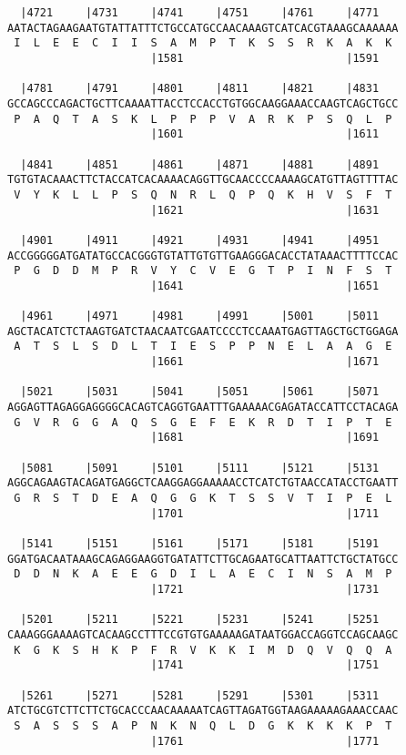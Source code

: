 \documentclass{article}
\begin{document}
\begin{Verbatim}
  |4721     |4731     |4741     |4751     |4761     |4771   
AATACTAGAAGAATGTATTATTTCTGCCATGCCAACAAAGTCATCACGTAAAGCAAAAAA
 I  L  E  E  C  I  I  S  A  M  P  T  K  S  S  R  K  A  K  K 
                      |1581                         |1591   
  
  |4781     |4791     |4801     |4811     |4821     |4831   
GCCAGCCCAGACTGCTTCAAAATTACCTCCACCTGTGGCAAGGAAACCAAGTCAGCTGCC
 P  A  Q  T  A  S  K  L  P  P  P  V  A  R  K  P  S  Q  L  P 
                      |1601                         |1611   
  
  |4841     |4851     |4861     |4871     |4881     |4891   
TGTGTACAAACTTCTACCATCACAAAACAGGTTGCAACCCCAAAAGCATGTTAGTTTTAC
 V  Y  K  L  L  P  S  Q  N  R  L  Q  P  Q  K  H  V  S  F  T 
                      |1621                         |1631   
  
  |4901     |4911     |4921     |4931     |4941     |4951   
ACCGGGGGATGATATGCCACGGGTGTATTGTGTTGAAGGGACACCTATAAACTTTTCCAC
 P  G  D  D  M  P  R  V  Y  C  V  E  G  T  P  I  N  F  S  T 
                      |1641                         |1651   
  
  |4961     |4971     |4981     |4991     |5001     |5011   
AGCTACATCTCTAAGTGATCTAACAATCGAATCCCCTCCAAATGAGTTAGCTGCTGGAGA
 A  T  S  L  S  D  L  T  I  E  S  P  P  N  E  L  A  A  G  E 
                      |1661                         |1671   
  
  |5021     |5031     |5041     |5051     |5061     |5071   
AGGAGTTAGAGGAGGGGCACAGTCAGGTGAATTTGAAAAACGAGATACCATTCCTACAGA
 G  V  R  G  G  A  Q  S  G  E  F  E  K  R  D  T  I  P  T  E 
                      |1681                         |1691   
  
  |5081     |5091     |5101     |5111     |5121     |5131   
AGGCAGAAGTACAGATGAGGCTCAAGGAGGAAAAACCTCATCTGTAACCATACCTGAATT
 G  R  S  T  D  E  A  Q  G  G  K  T  S  S  V  T  I  P  E  L 
                      |1701                         |1711   
  
  |5141     |5151     |5161     |5171     |5181     |5191   
GGATGACAATAAAGCAGAGGAAGGTGATATTCTTGCAGAATGCATTAATTCTGCTATGCC
 D  D  N  K  A  E  E  G  D  I  L  A  E  C  I  N  S  A  M  P 
                      |1721                         |1731   
  
  |5201     |5211     |5221     |5231     |5241     |5251   
CAAAGGGAAAAGTCACAAGCCTTTCCGTGTGAAAAAGATAATGGACCAGGTCCAGCAAGC
 K  G  K  S  H  K  P  F  R  V  K  K  I  M  D  Q  V  Q  Q  A 
                      |1741                         |1751   
  
  |5261     |5271     |5281     |5291     |5301     |5311   
ATCTGCGTCTTCTTCTGCACCCAACAAAAATCAGTTAGATGGTAAGAAAAAGAAACCAAC
 S  A  S  S  S  A  P  N  K  N  Q  L  D  G  K  K  K  K  P  T 
                      |1761                         |1771   
  

\end{Verbatim}
\end{document}
